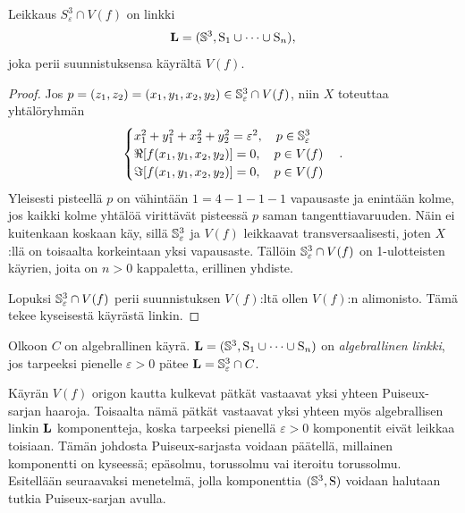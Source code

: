 \begin{seuraus}
    Leikkaus $S_\varepsilon^3\cap V(f)$ on linkki
    \begin{align*}
        \linkki=(\S^3,\solmu_1\cup\cdots\cup\solmu_n),
    \end{align*}
    joka perii suunnistuksensa käyrältä $V(f)$.
\end{seuraus}
\begin{proof}
    Jos $p=(z_1,z_2)=(x_1,y_1,x_2,y_2)\in\S_\varepsilon^3\cap V(f)$, niin $X$ toteuttaa yhtälöryhmän
    \begin{align*}
        \begin{cases}
            x_1^2+y_1^2+x_2^2+y_2^2=\varepsilon^2, \quad p\in\S_\varepsilon^3 \\
            \Re[f(x_1,y_1,x_2,y_2)]=0,\quad p\in V(f) \\
            \Im[f(x_1,y_1,x_2,y_2)]=0,\quad p\in V(f) \\
        \end{cases}.
    \end{align*}
    Yleisesti pisteellä $p$ on vähintään $1=4-1-1-1$ vapausaste ja enintään kolme, jos kaikki kolme yhtälöä virittävät pisteessä $p$ saman tangenttiavaruuden. Näin ei kuitenkaan koskaan käy, sillä $\S_\varepsilon^3$ ja $V(f)$ leikkaavat transversaalisesti, joten $X$:llä on toisaalta korkeintaan yksi vapausaste. Tällöin $\S_\varepsilon^3\cap V(f)$ on 1-ulotteisten käyrien, joita on $n>0$ kappaletta, erillinen yhdiste.

    Lopuksi $\S_\varepsilon^3\cap V(f)$ perii suunnistuksen $V(f)$:ltä ollen $V(f)$:n alimonisto. Tämä tekee kyseisestä käyrästä linkin.
\end{proof}
\begin{maaritelma}
    Olkoon $C$ on algebrallinen käyrä. $\linkki=(\S^3,\solmu_1\cup\dots\cup\solmu_n)$ on \emph{algebrallinen linkki}, jos tarpeeksi pienelle $\varepsilon>0$ pätee $\linkki=\S_\varepsilon^3\cap C$.
\end{maaritelma}
Käyrän $V(f)$ origon kautta kulkevat pätkät vastaavat yksi yhteen Puiseux-sarjan haaroja. Toisaalta nämä pätkät vastaavat yksi yhteen myös algebrallisen linkin $\linkki$ komponentteja, koska tarpeeksi pienellä $\varepsilon>0$ komponentit eivät leikkaa toisiaan. Tämän johdosta Puiseux-sarjasta voidaan päätellä, millainen komponentti on kyseessä; epäsolmu, torussolmu vai iteroitu torussolmu. Esitellään seuraavaksi menetelmä, jolla komponenttia $(\S^3,\solmu)$ voidaan halutaan tutkia Puiseux-sarjan avulla.

